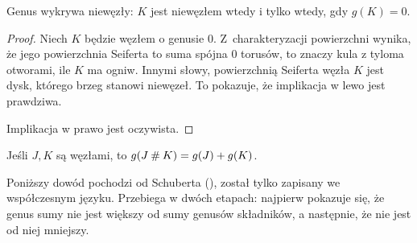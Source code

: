 \begin{proposition}
    \label{genus_one}
    Genus wykrywa niewęzły: $K$ jest niewęzłem wtedy i tylko wtedy, gdy $g(K) = 0$.
\end{proposition}

\begin{proof}
    Niech $K$ będzie węzłem o genusie $0$.
    Z~charakteryzacji powierzchni wynika, że jego powierzchnia Seiferta to suma spójna $0$ torusów, to znaczy kula z tyloma otworami, ile $K$ ma ogniw.
    Innymi słowy, powierzchnią Seiferta węzła $K$ jest dysk, którego brzeg stanowi niewęzeł.
    To pokazuje, że implikacja w lewo jest prawdziwa.

    Implikacja w prawo jest oczywista.
\end{proof}

\begin{proposition}
\label{genus_sum}
    Jeśli $J, K$ są węzłami, to $g (J \mathbin{\#} K) = g(J) + g(K)$.
\end{proposition}

Poniższy dowód pochodzi od Schuberta (\cite{schubert49}), został tylko zapisany we współczesnym języku.
Przebiega w dwóch etapach: najpierw pokazuje się, że genus sumy nie jest większy od sumy genusów składników, a następnie, że nie jest od niej mniejszy.

